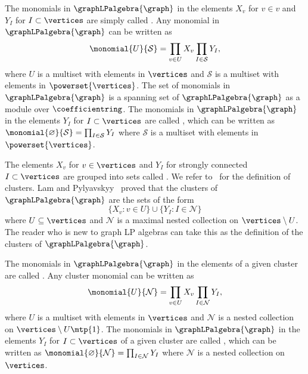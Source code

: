 The monomials in \(\graphLPalgebra{\graph}\) in the elements \(X_v\) for \(v \in v\) and \(Y_I\) for \(I \subset \vertices\) are simply called .
Any monomial in \(\graphLPalgebra{\graph}\) can be written as
\begin{equation*}
    \monomial{U}{\mathcal{S}} =
    \prod_{v \in U} X_v \prod_{I \in \mathcal{S}} Y_I,
\end{equation*}
where \(U\) is a multiset with elements in \(\vertices\) and \(\mathcal{S}\) is a multiset with elements in \(\powerset{\vertices}\).
The set of monomials in \(\graphLPalgebra{\graph}\) is a spanning set of \(\graphLPalgebra{\graph}\) as a module over \(\coefficientring\).
The monomials in \(\graphLPalgebra{\graph}\) in the elements \(Y_I\) for \(I \subset \vertices\) are called , which can be written as
\( \monomial{\varnothing}{\mathcal{S}} =
    \prod_{I \in \mathcal{S}} Y_I
\)
where \(\mathcal{S}\) is a multiset with elements in \(\powerset{\vertices}\).

The elements \(X_v\) for \(v \in \vertices\) and \(Y_I\) for strongly connected \(I \subset \vertices\) are grouped into sets called .
We refer to~\cite{linearLP} for the definition of clusters.
Lam and Pylyavskyy~\cite{linearLP} proved that the clusters of \(\graphLPalgebra{\graph}\) are the sets of the form
\begin{equation*}
    \{ X_v : v \in U\} \cup \{Y_I : I \in \mathcal{N}\}
\end{equation*}
where \(U \subseteq \vertices\) and \(\mathcal{N}\) is a maximal nested collection on \(\vertices \setminus U\).
The reader who is new to graph LP algebras can take this as the definition of the clusters of \(\graphLPalgebra{\graph}\).

The monomials in \(\graphLPalgebra{\graph}\) in the elements of a given cluster are called .
Any cluster monomial can be written as
\begin{equation*}
    \monomial{U}{\mathcal{N}} =
    \prod_{v \in U} X_v \prod_{I \in \mathcal{N}} Y_I,
\end{equation*}
where \(U\) is a multiset with elements in \(\vertices\) and \(\mathcal{N}\) is a nested collection on \(\vertices \setminus U\mtp{1}\).
The monomials in \(\graphLPalgebra{\graph}\) in the elements \(Y_I\) for \(I \subset \vertices\) of a given cluster are called , which can be written as \(\monomial{\varnothing}{\mathcal{N}} = \prod_{I \in \mathcal{N}} Y_I\) where \(\mathcal{N}\) is a nested collection on \(\vertices\).

